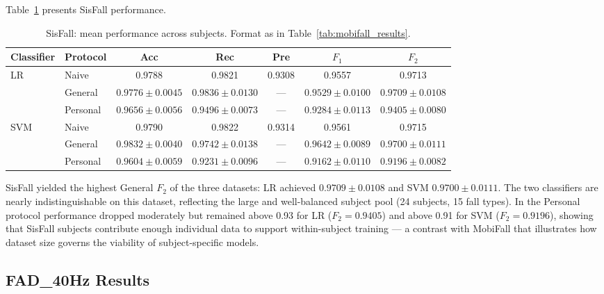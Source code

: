 Table~\ref{tab:sisfall_results} presents SisFall performance.

\begin{table}[h!]
\centering
\caption{SisFall: mean performance across subjects.  Format as in
  Table~\ref{tab:mobifall_results}.}
\label{tab:sisfall_results}
\setlength{\tabcolsep}{3pt}\footnotesize
\begin{tabular}{llccccc}
\toprule
\textbf{Classifier} & \textbf{Protocol}
  & \textbf{Acc} & \textbf{Rec} & \textbf{Pre}
  & \textbf{$F_1$} & \textbf{$F_2$} \\
\midrule
\multirow{3}{*}{LR}
 & Naive
   & 0.9788 & 0.9821 & 0.9308 & 0.9557 & 0.9713 \\
 & General
   & $0.9776 \pm 0.0045$ & $0.9836 \pm 0.0130$ & ---
   & $0.9529 \pm 0.0100$ & $0.9709 \pm 0.0108$ \\
 & Personal
   & $0.9656 \pm 0.0056$ & $0.9496 \pm 0.0073$ & ---
   & $0.9284 \pm 0.0113$ & $0.9405 \pm 0.0080$ \\
\midrule
\multirow{3}{*}{SVM}
 & Naive
   & 0.9790 & 0.9822 & 0.9314 & 0.9561 & 0.9715 \\
 & General
   & $0.9832 \pm 0.0040$ & $0.9742 \pm 0.0138$ & ---
   & $0.9642 \pm 0.0089$ & $0.9700 \pm 0.0111$ \\
 & Personal
   & $0.9604 \pm 0.0059$ & $0.9231 \pm 0.0096$ & ---
   & $0.9162 \pm 0.0110$ & $0.9196 \pm 0.0082$ \\
\bottomrule
\end{tabular}
\end{table}

SisFall yielded the highest General $F_2$ of the three datasets: LR achieved $0.9709 \pm 0.0108$ and SVM $0.9700 \pm 0.0111$. The two classifiers are nearly indistinguishable on this dataset, reflecting the large and well-balanced subject pool (24 subjects, 15 fall types). In the Personal protocol performance dropped moderately but remained above 0.93 for LR ($F_2 = 0.9405$) and above 0.91 for SVM ($F_2 = 0.9196$), showing that SisFall subjects contribute enough individual data to support within-subject training --- a contrast with MobiFall that illustrates how dataset size governs the viability of subject-specific models.


\subsection{FAD\_40Hz Results}
\label{subsubsec:fad_results}

